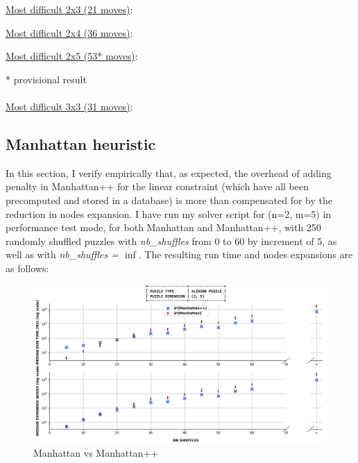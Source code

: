 \underline{Most difficult 2x3 (21 moves)}:
\begin{center}
\begin{five}
\end{five}
\end{center}
\underline{Most difficult 2x4 (36 moves)}:
\begin{center}
\begin{seven}
\end{seven}
\end{center}
\underline{Most difficult 2x5 (53* moves)}:
\begin{center}
\begin{nine}
\end{nine}
\end{center}
* provisional result
\\
\\
\underline{Most difficult 3x3 (31 moves)}:
\begin{center}
\begin{eight}
\end{eight}
\end{center}




\subsection{Manhattan heuristic}
In this section, I verify empirically that, as expected, the overhead of adding penalty in Manhattan++ for the linear constraint (which have all been precomputed and stored in a database) is more than compensated for by the reduction in nodes expansion. I have run my solver script for (n=2, m=5) in performance test mode, for both Manhattan and Manhattan++, with 250 randomly shuffled puzzles with \textit{nb\_shuffles} from 0 to 60 by increment of 5, as well as with \textit{nb\_shuffles = $\inf$}. The resulting run time and nodes expansions are as follows:

\begin{figure}[H]
\centering
\hspace*{-2.5cm}
\includegraphics[scale=0.45]{./Figures/25SPPerformanceManhattan}
\caption[SP]{Manhattan vs Manhattan++}
\label{fig:25SPPerformanceManhattan}
\end{figure}

